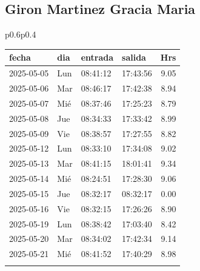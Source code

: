 \documentclass[11pt,a4paper]{article}
\newcommand{\mejoradatabla}[1]{
  \renewcommand{\arraystretch}{1.3}
  \setlength{\tabcolsep}{10pt}
#1
  \renewcommand{\arraystretch}{1}
  \setlength{\tabcolsep}{6pt}
}
\begin{document}
\subsection{ Giron Martinez Gracia Maria }


\begin{tabular}{p{}p{}}
\mejoradatabla{
\begin{tabular}{p{2cm} p{0.6cm} p{1.2cm} p{1.2cm} r}
\toprule
\rowcolor{grisclaro} \textbf{fecha} & \textbf{dia} & \textbf{entrada} & \textbf{salida} & \textbf{Hrs}\\
\midrule

\rowcolor{white}%
2025-05-05 & Lun & 08:41:12 & 17:43:56 &9.05\\
\rowcolor{white}%
2025-05-06 & Mar & 08:46:17 & 17:42:38 &8.94\\
\rowcolor{white}%
2025-05-07 & Mié & 08:37:46 & 17:25:23 &8.79\\
\rowcolor{white}%
2025-05-08 & Jue & 08:34:33 & 17:33:42 &8.99\\
\rowcolor{white}%
2025-05-09 & Vie & 08:38:57 & 17:27:55 &8.82\\
\rowcolor{white}%
2025-05-12 & Lun & 08:33:10 & 17:34:08 &9.02\\
\rowcolor{white}%
2025-05-13 & Mar & 08:41:15 & 18:01:41 &9.34\\
\rowcolor{white}%
2025-05-14 & Mié & 08:24:51 & 17:28:30 &9.06\\
\rowcolor{jornadacero!20}%
2025-05-15 & Jue & 08:32:17 & 08:32:17 &\textcolor{jornadacero}{ 0.00 }\\
\rowcolor{white}%
2025-05-16 & Vie & 08:32:15 & 17:26:26 &8.90\\
\rowcolor{white}%
2025-05-19 & Lun & 08:38:42 & 17:03:40 &8.42\\
\rowcolor{white}%
2025-05-20 & Mar & 08:34:02 & 17:42:34 &9.14\\
\rowcolor{white}%
2025-05-21 & Mié & 08:41:52 & 17:40:29 &8.98\\
\rowcolor{white}%

\end{tabular}}
\end{tabular}
\end{document}
